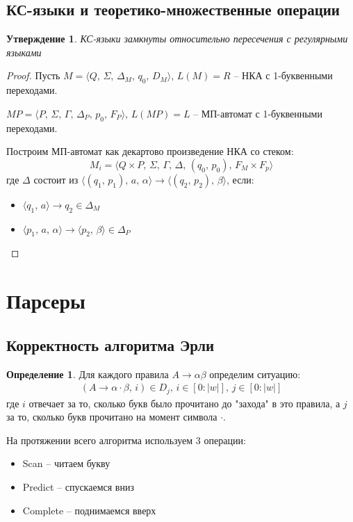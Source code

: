 \documentclass[a4paper,12pt]{article}
\theoremstyle{plain}
\newtheorem{proposition}{Утверждение}[subsection]
\theoremstyle{definition}
\newtheorem{definition}{Определение}[subsection]
\theoremstyle{remark}
\begin{document}
\subsection{КС-языки и теоретико-множественные операции}
\begin{proposition}
	КС-языки замкнуты относительно пересечения с регулярными языками
\end{proposition}

\begin{proof}
	Пусть $M = \langle Q,\, \Sigma,\, \Delta_M,\, q_0,\, D_M\rangle,\, L(M) = R$ -- НКА с 1-буквенными переходами.

	$MP = \langle P,\, \Sigma,\, \Gamma,\, \Delta_P,\, p_0,\, F_P\rangle,\, L(MP) = L$ -- МП-автомат с 1-буквенными переходами.

	Построим МП-автомат как декартово произведение НКА со стеком:
	\[
		M_i = \langle Q \times P,\, \Sigma,\, \Gamma,\, \Delta,\, (q_0,\, p_0),\, F_M \times F_p\rangle
	\]
	где $\Delta$ состоит из $\langle(q_1,\, p_1),\, a,\,\alpha\rangle \to\langle (q_2,\, p_2),\, \beta\rangle$, если:
	\begin{itemize}
		\item $\langle q_1,\, a\rangle \to q_2 \in \Delta_M$
		\item $\langle p_1,\,a,\,\alpha\rangle\to\langle p_2,\, \beta\rangle \in \Delta_P$
	\end{itemize}
\end{proof}

\section{Парсеры}
\subsection{Корректность алгоритма Эрли}
\begin{definition}
	Для каждого правила $A \to \alpha\beta$ определим ситуацию:
	\begin{align*}
		(A \to \alpha\cdot\beta,\, i) \in D_j,\, i \in [0 : \vert w\vert],\, j \in [0 : \vert w\vert]
	\end{align*}
	где $i$ отвечает за то, сколько букв было прочитано до "захода" в это правила, а $j$ за то, сколько букв прочитано на момент символа $\cdot$.
\end{definition}

На протяжении всего алгоритма используем 3 операции:
\begin{itemize}
	\item Scan -- читаем букву
	\item Predict -- спускаемся вниз
	\item Complete -- поднимаемся вверх
\end{itemize}
\end{document}

